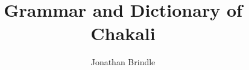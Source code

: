 

\title{Grammar and Dictionary of Chakali}  %
\subtitle{}
\dedication{Change dedication in localmetadata.sty}
\author{Jonathan Brindle}
 
\renewcommand{\lsISBNdigital}{000-0-000000-00-0}
\renewcommand{\lsISBNhardcover}{000-0-000000-00-0}
\renewcommand{\lsISBNsoftcover}{000-0-000000-00-0}
\renewcommand{\lsSeries}{algad} %
\renewcommand{\lsSeriesNumber}{1} %
\renewcommand{\lsURL}{http://langsci-press.org/catalog/book/74} %


